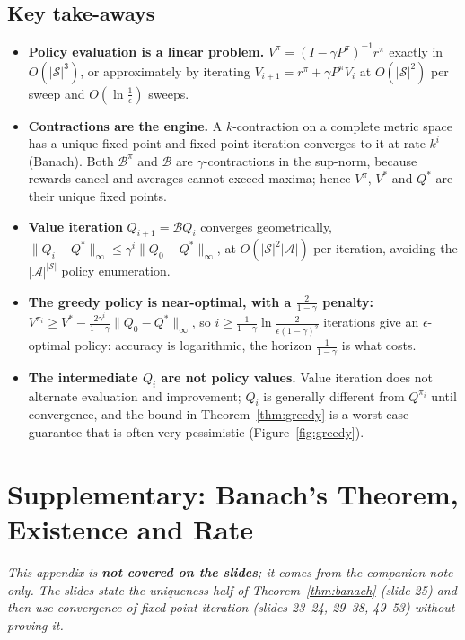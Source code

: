 \documentclass[11pt,a4paper]{article}
\newcommand{\cS}{\mathcal{S}}
\newcommand{\cA}{\mathcal{A}}
\newcommand{\Bell}{\mathcal{B}}
\newcommand{\Bpi}{\mathcal{B}^{\pi}}
\newcommand{\norm}[1]{\lVert #1\rVert_\infty}
\theoremstyle{plain}
\theoremstyle{definition}
\theoremstyle{remark}
\newcommand{\figref}[1]{Figure~\ref{#1}}
\begin{document}
\subsection{Key take-aways}
\begin{itemize}
  \item \textbf{Policy evaluation is a linear problem.} $V^\pi=(I-\gamma P^\pi)^{-1}r^\pi$ exactly in $O(|\cS|^3)$, or approximately by iterating $V_{i+1}=r^\pi+\gamma P^\pi V_i$ at $O(|\cS|^2)$ per sweep and $O(\ln\frac1\epsilon)$ sweeps.
  \item \textbf{Contractions are the engine.} A $k$-contraction on a complete metric space has a unique fixed point and fixed-point iteration converges to it at rate $k^i$ (Banach). Both $\Bpi$ and $\Bell$ are $\gamma$-contractions in the sup-norm, because rewards cancel and averages cannot exceed maxima; hence $V^\pi$, $V^*$ and $Q^*$ are their unique fixed points.
  \item \textbf{Value iteration} $Q_{i+1}=\Bell Q_i$ converges geometrically, $\norm{Q_i-Q^*}\le\gamma^i\norm{Q_0-Q^*}$, at $O(|\cS|^2|\cA|)$ per iteration, avoiding the $|\cA|^{|\cS|}$ policy enumeration.
  \item \textbf{The greedy policy is near-optimal, with a $\frac{2}{1-\gamma}$ penalty:} $V^{\pi_i}\ge V^*-\frac{2\gamma^i}{1-\gamma}\norm{Q_0-Q^*}$, so $i\ge\frac1{1-\gamma}\ln\frac2{\epsilon(1-\gamma)^2}$ iterations give an $\epsilon$-optimal policy: accuracy is logarithmic, the horizon $\frac1{1-\gamma}$ is what costs.
  \item \textbf{The intermediate $Q_i$ are not policy values.} Value iteration does not alternate evaluation and improvement; $Q_i$ is generally different from $Q^{\pi_i}$ until convergence, and the bound in Theorem~\ref{thm:greedy} is a worst-case guarantee that is often very pessimistic (\figref{fig:greedy}).
\end{itemize}

\appendix
\section{Supplementary: Banach's Theorem, Existence and Rate}\label{app:banach}
\emph{This appendix is \textbf{not covered on the slides}; it comes from the companion note only. The slides state the uniqueness half of Theorem~\ref{thm:banach} (slide 25) and then use convergence of fixed-point iteration (slides 23--24, 29--38, 49--53) without proving it.}
\end{document}
